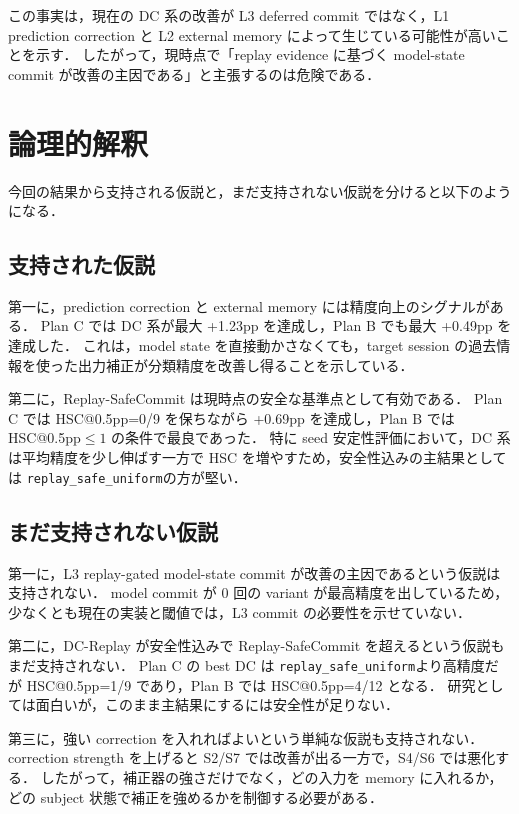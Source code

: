 \documentclass[a4paper,11pt]{ltjsarticle}
\makeatletter
\newcommand{\replay}{\texttt{replay\_safe\_uniform}}
\newcommand{\hsc}{HSC@0.5pp}
\makeatother
\begin{document}
この事実は，現在の DC 系の改善が L3 deferred commit ではなく，L1 prediction correction と L2 external memory によって生じている可能性が高いことを示す．
したがって，現時点で「replay evidence に基づく model-state commit が改善の主因である」と主張するのは危険である．

\section{論理的解釈}

今回の結果から支持される仮説と，まだ支持されない仮説を分けると以下のようになる．

\subsection{支持された仮説}

第一に，prediction correction と external memory には精度向上のシグナルがある．
Plan C では DC 系が最大 +1.23pp を達成し，Plan B でも最大 +0.49pp を達成した．
これは，model state を直接動かさなくても，target session の過去情報を使った出力補正が分類精度を改善し得ることを示している．

第二に，Replay-SafeCommit は現時点の安全な基準点として有効である．
Plan C では \hsc=0/9 を保ちながら +0.69pp を達成し，Plan B では \hsc \(\leq 1\) の条件で最良であった．
特に seed 安定性評価において，DC 系は平均精度を少し伸ばす一方で HSC を増やすため，安全性込みの主結果としては \replay の方が堅い．

\subsection{まだ支持されない仮説}

第一に，L3 replay-gated model-state commit が改善の主因であるという仮説は支持されない．
model commit が 0 回の variant が最高精度を出しているため，少なくとも現在の実装と閾値では，L3 commit の必要性を示せていない．

第二に，DC-Replay が安全性込みで Replay-SafeCommit を超えるという仮説もまだ支持されない．
Plan C の best DC は \replay より高精度だが \hsc=1/9 であり，Plan B では \hsc=4/12 となる．
研究としては面白いが，このまま主結果にするには安全性が足りない．

第三に，強い correction を入れればよいという単純な仮説も支持されない．
correction strength を上げると S2/S7 では改善が出る一方で，S4/S6 では悪化する．
したがって，補正器の強さだけでなく，どの入力を memory に入れるか，どの subject 状態で補正を強めるかを制御する必要がある．
\end{document}

